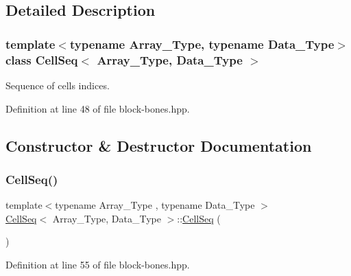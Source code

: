\subsection{Detailed Description}
\subsubsection*{template$<$typename Array\+\_\+\+Type, typename Data\+\_\+\+Type$>$\newline
class Cell\+Seq$<$ Array\+\_\+\+Type, Data\+\_\+\+Type $>$}

Sequence of cells indices. 



Definition at line 48 of file block-\/bones.\+hpp.



\subsection{Constructor \& Destructor Documentation}
\mbox{\label{class_cell_seq_a1668f6f6768838864d1a85f018be2aa6}} 
\subsubsection{\texorpdfstring{Cell\+Seq()}{CellSeq()}\hspace{0.1cm}{\footnotesize\ttfamily [1/2]}}
{\footnotesize\ttfamily template$<$typename Array\+\_\+\+Type , typename Data\+\_\+\+Type $>$ \\
\hyperlink{class_cell_seq}{Cell\+Seq}$<$ Array\+\_\+\+Type, Data\+\_\+\+Type $>$\+::\hyperlink{class_cell_seq}{Cell\+Seq} (\begin{DoxyParamCaption}{ }\end{DoxyParamCaption})\hspace{0.3cm}{\ttfamily [inline]}}



Definition at line 55 of file block-\/bones.\+hpp.

\mbox{\label{class_cell_seq_aa08a1ebbb81673baea62c9eb91946f4d}} 

